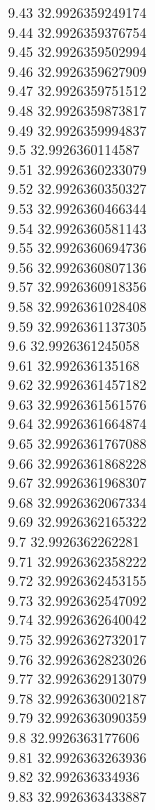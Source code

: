 {9.43	32.9926359249174\\
9.44	32.9926359376754\\
9.45	32.9926359502994\\
9.46	32.9926359627909\\
9.47	32.9926359751512\\
9.48	32.9926359873817\\
9.49	32.9926359994837\\
9.5	32.9926360114587\\
9.51	32.9926360233079\\
9.52	32.9926360350327\\
9.53	32.9926360466344\\
9.54	32.9926360581143\\
9.55	32.9926360694736\\
9.56	32.9926360807136\\
9.57	32.9926360918356\\
9.58	32.9926361028408\\
9.59	32.9926361137305\\
9.6	32.9926361245058\\
9.61	32.992636135168\\
9.62	32.9926361457182\\
9.63	32.9926361561576\\
9.64	32.9926361664874\\
9.65	32.9926361767088\\
9.66	32.9926361868228\\
9.67	32.9926361968307\\
9.68	32.9926362067334\\
9.69	32.9926362165322\\
9.7	32.9926362262281\\
9.71	32.9926362358222\\
9.72	32.9926362453155\\
9.73	32.9926362547092\\
9.74	32.9926362640042\\
9.75	32.9926362732017\\
9.76	32.9926362823026\\
9.77	32.9926362913079\\
9.78	32.9926363002187\\
9.79	32.9926363090359\\
9.8	32.9926363177606\\
9.81	32.9926363263936\\
9.82	32.992636334936\\
9.83	32.9926363433887\\
}
